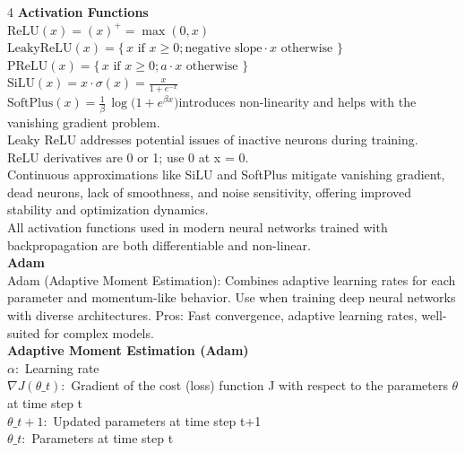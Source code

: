 \documentclass[8pt]{extarticle}
\begin{document}
\begin{multicols}{4}
\vspace{2pt}\textbf{Activation Functions}\\
$\text{ReLU}(x) = (x)^{+} = \max(0, x)$\\
$\text{LeakyReLU}(x) = \{\, x \text{ if } x \ge 0; \text{negative slope}\cdot x \text{ otherwise } \}$\\
$\text{PReLU}(x) = \{\, x \text{ if } x \ge 0; a\cdot x \text{ otherwise } \}$\\
$\text{SiLU}(x) = x\cdot\sigma(x) = \frac{x}{1 + e^{-x}}$\\
$\text{SoftPlus}(x) = \frac{1}{\beta}\,\log\!\bigl(1 + e^{\beta x}\bigr)$\ReLU introduces non-linearity and helps with the vanishing gradient problem.\\
Leaky ReLU addresses potential issues of inactive neurons during training.\\
ReLU derivatives are 0 or 1; use 0 at x = 0.\\
Continuous approximations like SiLU and SoftPlus mitigate vanishing gradient, dead neurons, lack of smoothness, and noise sensitivity, offering improved stability and optimization dynamics.\\
All activation functions used in modern neural networks trained with backpropagation are both differentiable and non-linear.\\
\vspace{2pt}\textbf{Adam}\\
Adam (Adaptive Moment Estimation): Combines adaptive learning rates for each parameter and momentum-like behavior. Use when training deep neural networks with diverse architectures. Pros: Fast convergence, adaptive learning rates, well-suited for complex models.\\
\vspace{2pt}\textbf{Adaptive Moment Estimation (Adam)}\\
$\alpha$:\ Learning rate\\
$\nabla J(\theta\_t)$:\ Gradient of the cost (loss) function J with respect to the parameters $\theta$ at time step t\\
$\theta\_{t+1}$:\ Updated parameters at time step t+1\\
$\theta\_t$:\ Parameters at time step t\\


\end{multicols}
\end{document}
